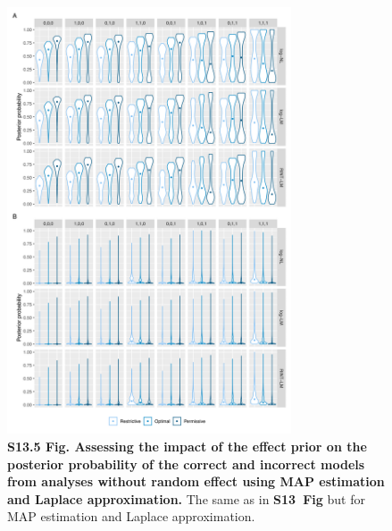 \documentclass[11pt]{article}
\newcommand{\sfigppeffectone}{\textbf{S13~Fig}\xspace}
\begin{document}
\begin{figure}[!ht]
\begin{center}
  \includegraphics[width=0.75\textwidth]{png/sim_vln_effect_map_lap_noranef_noranef.png}
\end{center}  
\caption{
  {\bf
    S13.5 Fig.
    Assessing the impact of the effect prior on the posterior probability of the correct and incorrect models from analyses without random effect using MAP estimation and Laplace approximation.}
The same as in \sfigppeffectone but for MAP estimation and Laplace approximation.
}
\label{s-fig:sim-effect-map-noranef-noranef}
\end{figure}
\end{document}
